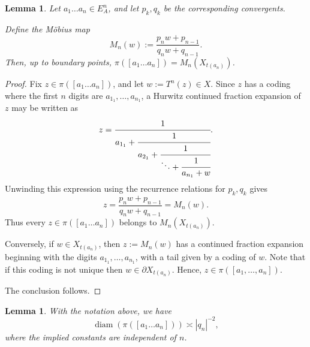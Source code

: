 \documentclass[11pt]{amsart}
\theoremstyle{plain}
\newtheorem{lemma}[theorem]{Lemma}
\theoremstyle{definition}
\renewcommand\~{\tilde}%
\numberwithin{equation}{section}
\begin{document}
\begin{lemma}
Let $a_1\dots a_n\in E_A^n$, and let $p_k,q_k$ be the corresponding convergents.

Define the Möbius map
$$
M_n(w):=\frac{p_n w+p_{n-1}}{q_n w+q_{n-1}}.
$$
Then, up to boundary points,
$\pi([a_1\dots a_n])=M_n(X_{t(a_{n})})$.
\end{lemma}

\begin{proof}
Fix $z\in \pi([a_1\dots a_n])$, and let $w:=T^n(z)\in X.$
Since $z$ has a coding where the first $n$ digits are $a_{1_1},\dots,a_{n_1}$, a Hurwitz continued fraction expansion of $z$ may be written as
$$
z=\cfrac{1}{a_{1_1}+\cfrac{1}{a_{2_1}+\cfrac{1}{\ddots+\cfrac{1}{a_{n_1}+w}}}}.
$$
Unwinding this expression using the recurrence relations for $p_k,q_k$ gives
$$
z=\frac{p_n w+p_{n-1}}{q_n w+q_{n-1}}=M_n(w).
$$
Thus every $z\in \pi([a_1\dots a_n])$ belongs to $M_n(X_{t(a_{n})})$.

Conversely, if $w\in X_{t(a_{n})}$, then $z:=M_n(w)$
has a continued fraction expansion beginning with the digits $a_{1_1},\dots,a_{n_1}$, with a tail given by a coding of $w$. Note that if this coding is not unique then $w\in \partial X_{t(a_{n})}$. Hence, $z\in \pi([a_1,\dots,a_n])$.

The conclusion follows.
\end{proof}

\begin{lemma}\label{lem:diameter}
With the notation above, we have
$$
\operatorname{diam}(\pi([a_1\dots a_n]))\asymp |q_n|^{-2},
$$
where the implied constants are independent of $n$.
\end{lemma}
\end{document}
